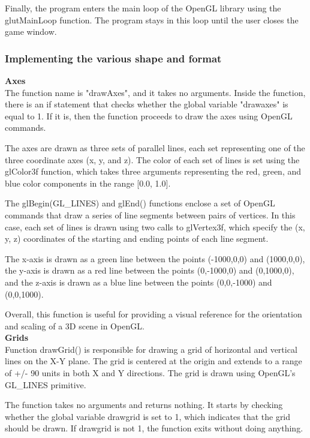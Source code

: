 \documentclass[12pt,a4]{article}
\begin{document}
{Finally, the program enters the main loop of the OpenGL library using the glutMainLoop function. The program stays in this loop until the user closes the game window.\\
\subsubsection{Implementing the various shape and format}
\textbf{\Large{Axes}}\\
The function name is "drawAxes", and it takes no arguments. Inside the function, there is an if statement that checks whether the global variable "drawaxes" is equal to 1. If it is, then the function proceeds to draw the axes using OpenGL commands.

The axes are drawn as three sets of parallel lines, each set representing one of the three coordinate axes (x, y, and z). The color of each set of lines is set using the glColor3f function, which takes three arguments representing the red, green, and blue color components in the range [0.0, 1.0].

The glBegin(GL\_LINES) and glEnd() functions enclose a set of OpenGL commands that draw a series of line segments between pairs of vertices. In this case, each set of lines is drawn using two calls to glVertex3f, which specify the (x, y, z) coordinates of the starting and ending points of each line segment.

The x-axis is drawn as a green line between the points (-1000,0,0) and (1000,0,0), the y-axis is drawn as a red line between the points (0,-1000,0) and (0,1000,0), and the z-axis is drawn as a blue line between the points (0,0,-1000) and (0,0,1000).

Overall, this function is useful for providing a visual reference for the orientation and scaling of a 3D scene in OpenGL.\\

\textbf{\Large{Grids}}\\
 Function drawGrid() is responsible for drawing a grid of horizontal and vertical lines on the X-Y plane. The grid is centered at the origin and extends to a range of +/- 90 units in both X and Y directions. The grid is drawn using OpenGL's GL\_LINES primitive.

The function takes no arguments and returns nothing. It starts by checking whether the global variable drawgrid is set to 1, which indicates that the grid should be drawn. If drawgrid is not 1, the function exits without doing anything.

}
\end{document}
